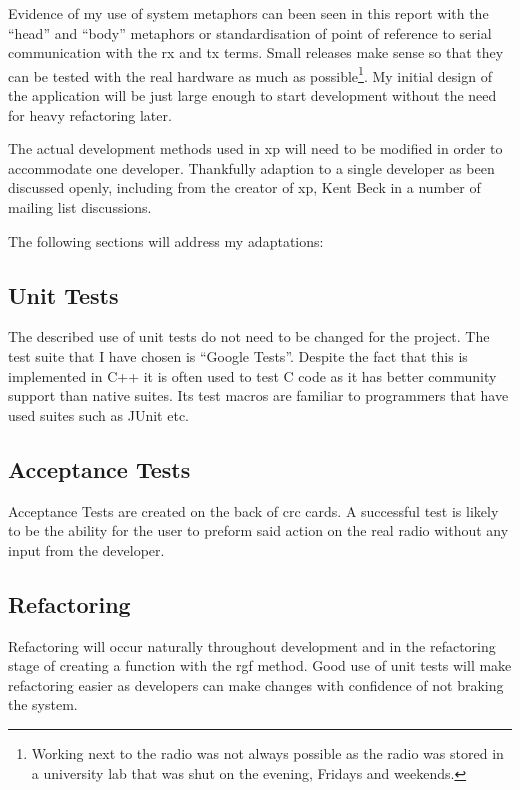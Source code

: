 
Evidence of my use of system metaphors can been seen in this report with the ``head'' and ``body'' metaphors or standardisation of point of reference to serial communication with the \gls{rx} and \gls{tx}  terms. Small releases make sense so that they can be tested with the real hardware as much as possible\footnote{Working next to the radio was not always possible as the radio was stored in a university lab that was shut on the evening, Fridays and weekends.}. My initial design of the application will be just large enough to start development without the need for heavy refactoring later. 

The actual development methods used in \gls{xp} will need to be modified in order to accommodate one developer. Thankfully adaption to a single developer as been discussed openly, including from the creator of \gls{xp}, Kent Beck in a number of mailing list discussions\cite{xpforone}\cite{lone_developer}.

The following sections will address my adaptations:
\subsection*{Unit Tests}
The described use of unit tests do not need to be changed for the project. The test suite that I have chosen is ``Google Tests''\cite{google_tests}. Despite the fact that this is implemented in C++ it is often used to test C code as it has better community support than native suites. Its test macros are familiar to programmers that have used suites such as JUnit etc.  

\subsection*{Acceptance Tests}
Acceptance Tests are created on the back of \gls{crc} cards. A successful test is likely to be the ability for the user to preform said action on the real radio without any input from the developer.

\subsection*{Refactoring}
Refactoring will occur naturally throughout development and in the refactoring stage of creating a function with the \gls{rgf} method. Good use of unit tests will make refactoring easier as developers can make changes with confidence of not braking the system.


